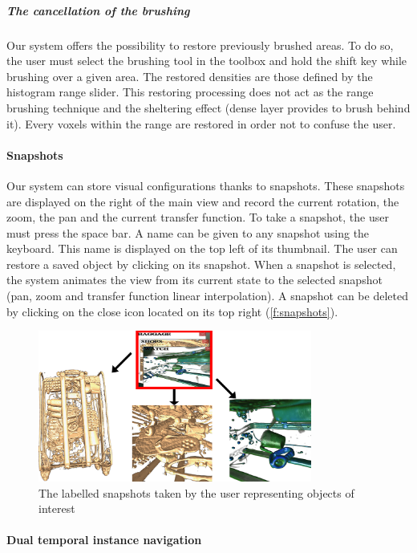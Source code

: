 \subparagraph{The cancellation of the brushing}
Our system offers the possibility to restore previously brushed areas. To do so, the user must select the brushing tool in the toolbox and hold the shift key while brushing over a given area. The restored densities are those defined by the histogram range slider. This restoring processing does not act as the range brushing technique and the sheltering effect (dense layer provides to brush behind it). Every voxels within the range are restored in order not to confuse the user.

\paragraph{Snapshots}
Our system can store visual configurations thanks to snapshots. These snapshots are displayed on the right of the main view and record the current rotation, the zoom, the pan and the current transfer function.
To take a snapshot, the user must press the space bar. A name can be given to any snapshot using the keyboard. This name is displayed on the top left of its thumbnail. The user can restore a saved object by clicking on its snapshot. When a snapshot is selected, the system animates the view from its current state to the selected snapshot (pan, zoom and transfer function linear interpolation). A snapshot can be deleted by clicking on the close icon located on its top right (\autoref{f:snapshots}).
 \begin{figure}
 \centering
	\includegraphics[width=9cm]{Figures/snapshots.png}
	\caption{ The labelled snapshots taken by the user representing objects of interest}
	\label{f:snapshots}
\end{figure}

\paragraph{Dual temporal instance navigation}

